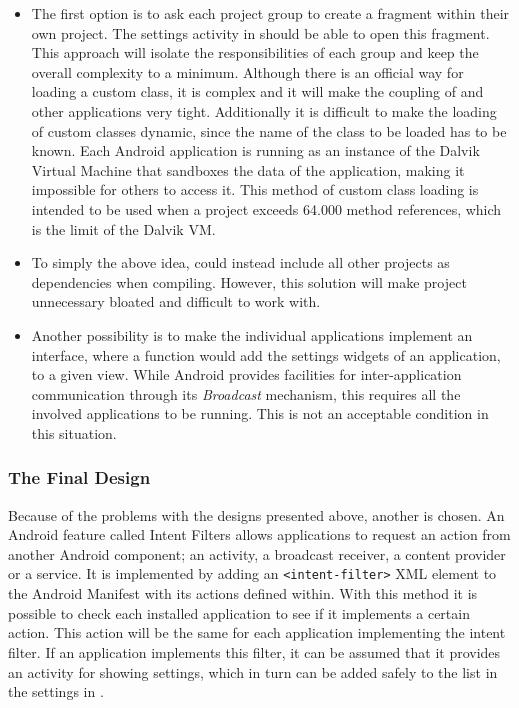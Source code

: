\begin{itemize}
\item 
The first option is to ask each project group to create a fragment within their own project. 
The settings activity in \launcher should be able to open this fragment.
This approach will isolate the responsibilities of each group and keep the overall complexity to a minimum.
Although there is an official way for loading a custom class\cite{customClassLoading}, it is complex and it will make the coupling of \launcher and other applications very tight.
Additionally it is difficult to make the loading of custom classes dynamic, since the name of the class to be loaded has to be known.
Each Android application is running as an instance of the Dalvik Virtual Machine that sandboxes the data of the application, making it impossible for others to access it.
This method of custom class loading is intended to be used when a project exceeds 64.000 method references, which is the limit of the Dalvik VM.

\item
To simply the above idea, \launcher could instead include all other projects as dependencies when compiling. 
However, this solution will make \launcher project unnecessary bloated and difficult to work with.

\item
Another possibility is to make the individual applications implement an interface, where a function would add the settings widgets of an application, to a given view.
While Android provides facilities for inter-application communication through its \textit{Broadcast} mechanism\cite{broadcastReceiver}, this requires all the involved applications to be running.
This is not an acceptable condition in this situation. 
\end{itemize}
 
\subsubsection{The Final Design}
Because of the problems with the designs presented above, another is chosen.
An Android feature called Intent Filters allows applications to request an action from another Android component; an activity, a broadcast receiver, a content provider or a service.
It is implemented by adding an \lstinline|<intent-filter>| XML element to the Android Manifest with its actions defined within\cite{intentFilter}.
With this method it is possible to check each installed application to see if it implements a certain action.
This action will be the same for each \giraf application implementing the intent filter.
If an application implements this filter, it can be assumed that it provides an activity for showing settings, which in turn can be added safely to the list in the settings in \launcher.

